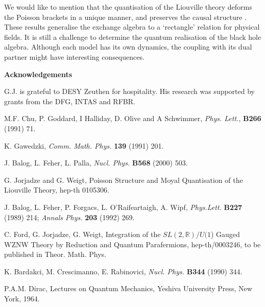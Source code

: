 \documentclass[a4paper,12pt]{article}
\newcommand{\rr}{\mathbb{R}}
\begin{document}
We would like to mention that the quantisation of the  Liouville
theory deforms the Poisson brackets in a unique manner, and preserves
the causal structure \cite{JW}. These results generalise the exchange algebra
 to a `rectangle' relation for physical fields.
It is still a challenge to determine the quantum realisation of the black hole
algebra. Although each model has its own dynamics, the coupling with its
dual partner might have interesting consequences.

\vspace{0.5cm}

\noindent
{\bf {\Large Acknowledgements}}

\vspace{0.3cm}


G.J. is grateful to DESY Zeuthen for hospitality.  His
research was supported by grants from the DFG, INTAS and RFBR.



\begin{thebibliography}{xx}
\frenchspacing


 M.F. Chu, P. Goddard, I Halliday, D. Olive and A
  Schwimmer, {\it Phys. Lett.}, {\bf B266} (1991) 71.

 K. Gawedzki, {\it Comm. Math. Phys.} {\bf
    139} (1991) 201.

 J. Balog, L. Feher, L. Palla, {\it Nucl. Phys.} {\bf
      B568} (2000) 503.

 G. Jorjadze and G. Weigt, Poisson Structure and Moyal
  Quantisation of the Liouville Theory, hep-th 0105306.

 J. Balog, L. Feher, P. Forgacs, L.
  O'Raifeartaigh, A.  Wipf, {\it Phys.Lett.} {\bf B227} (1989) 214;
  {\it Annals Phys.} {\bf 203} (1992) 269.

 C. Ford, G. Jorjadze, G. Weigt, Integration of the
  $SL(2,\rr)/U(1$) Gauged WZNW Theory by Reduction and Quantum
  Parafermions, hep-th/0003246, to be published in Theor. Math. Phys.

 K. Bardakci, M. Crescimanno, E. Rabinovici,
    {\it Nucl. Phys.} {\bf B344} (1990) 344.

 P.A.M. Dirac, Lectures on Quantum Mechanics,
Yeshiva University Press, New York, 1964.



\end{thebibliography}
\end{document}
